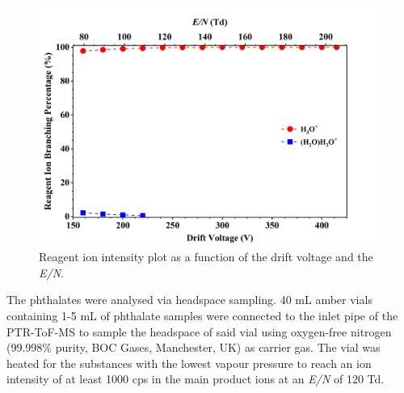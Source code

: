         \begin{figure}[htbp]
        \centering
        \includegraphics[height=0.4\textheight]{pics/PH/RI-BR.png}
        \caption{Reagent ion intensity plot as a function of the drift voltage and the \textit{E/N}.}
        \label{fig:PH_RI}
        \end{figure}




The phthalates were analysed via headspace sampling. 
%
40 mL amber vials containing 1-5 mL of  phthalate samples were connected to the inlet pipe of the PTR-ToF-MS to sample the headspace of said vial using oxygen-free nitrogen (99.998\% purity, BOC Gases, Manchester, UK) as carrier gas.
%
The vial was heated for the substances with the lowest vapour pressure  %
to reach an ion intensity of at least 1000%
 cps in the main product ions  at an \textit{E/N} of 120 Td.
%



